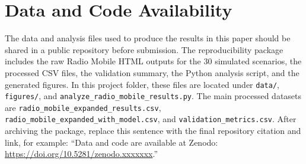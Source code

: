 \documentclass[journal]{IEEEtran}
\begin{document}
\section*{Data and Code Availability}

The data and analysis files used to produce the results in this paper should be shared in a public repository before submission. The reproducibility package includes the raw Radio Mobile HTML outputs for the 30 simulated scenarios, the processed CSV files, the validation summary, the Python analysis script, and the generated figures. In this project folder, these files are located under \texttt{data/}, \texttt{figures/}, and \texttt{analyze\_radio\_mobile\_results.py}. The main processed datasets are \texttt{radio\_mobile\_expanded\_results.csv}, \texttt{radio\_mobile\_expanded\_with\_model.csv}, and \texttt{validation\_metrics.csv}. After archiving the package, replace this sentence with the final repository citation and link, for example: ``Data and code are available at Zenodo: \url{https://doi.org/10.5281/zenodo.xxxxxxx}.''



\end{document}
